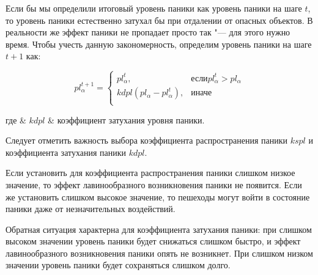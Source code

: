 Если бы мы определили итоговый уровень паники как уровень паники на шаге $t$,
то уровень паники естественно затухал бы при отдалении от опасных объектов.
В реальности же эффект паники не пропадает просто так "--- для этого нужно время.
Чтобы учесть данную закономерность, определим уровень паники на шаге $t + 1$ как:

\begin{equation}
  \label{sec:model:sf:panic:level}
  pl_\alpha^{t + 1} =
    \begin{cases}
      pl_\alpha^t, &\text{если} pl_\alpha^t > pl_\alpha \\
      kdpl (pl_\alpha - pl_\alpha^t), &\text{иначе} \\
    \end{cases}
\end{equation}
\begin{explanation}
где & $ kdpl $ & коэффициент затухания уровня паники. \\
\end{explanation}


Следует отметить важность выбора коэффициента распространения паники $kspl$ и коэффициента затухания паники $kdpl$.

Если установить для коэффициента распространения паники слишком низкое значение, то эффект лавинообразного возникновения паники не появится.
Если же установить слишком высокое значение, то пешеходы могут войти в состояние паники даже от незначительных воздействий.

Обратная ситуация характерна для коэффициента затухания паники:
при слишком высоком значении уровень паники будет снижаться слишком быстро,
и эффект лавинообразного возникновения паники опять не возникнет.
При слишком низком значении уровень паники будет сохраняться слишком долго.
